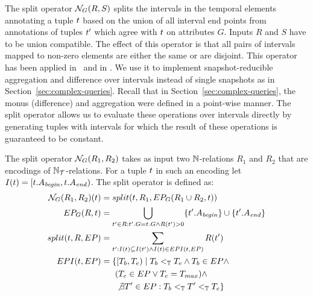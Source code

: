 The split operator $\mathcal{N}_{G}(R,S)$ splits the intervals in the
temporal elements annotating a tuple $t$ based on the union of
all interval end points from annotations of tuples $t'$ which
agree with $t$ on attributes $G$. Inputs $R$ and $S$ have to be
union compatible. The effect of this operator is that all pairs of
intervals mapped to non-zero elements are either the same or are
disjoint. This operator has been applied
in~\cite{DignosBG12,DignosBGJ16} and in \cite{BowmanT03,T98}. We use
it to implement snapshot-reducible aggregation and difference over
intervals instead of single snapshots as in
Section~\ref{sec:complex-queries}. Recall that in Section~\ref{sec:complex-queries}, the monus (difference) and aggregation were defined in a point-wise manner. The split operator allows us to evaluate these operations over intervals directly by generating tuples with intervals for which the result of these operations is guaranteed to be constant.

\begin{defi}
  The split operator $\mathcal{N}_G(R_1,R_2)$ takes as input two ${\mathbb{N}}$-relations $R_1$ and $R_2$ that are encodings of ${{\mathbb{N}}}_{\mathcal{T}}$-relations. For a tuple $t$ in such an encoding let $I(t) = [t.A_\mathit{begin}, t.A_\mathit{end})$. The split operator is defined as:
  \begin{align*}
    \normalizeOp_G(R_1,R_2)(\tuple) &= split(\tuple, R_1, EP_G(R_1 \cup R_2,t))\\
    EP_G(R,t) &= \bigcup_{t' \in R: t'.G = t.G \wedge R(t') > 0} \{t'.\attrBegin \} \cup \{t'.\attrEnd\}\\ %
    split(\tuple, R, EP) &= \sum_{\tuple': \interval(\tuple) \subseteq \interval(\tuple') \wedge \interval(\tuple) \in EPI(t, EP)} R(\tuple')\\
    EPI(t, EP) &= \{ [\tPoint_b , \tPoint_e) \mid  \tPoint_b \tLe \tPoint_e \wedge \tPoint_b \in EP \wedge\\ &\mathtab\mathtab(\tPoint_e  \in EP \vee T_e = \tMax) \wedge\\ &\mathtab\mathtab \not\exists \tPoint' \in EP: \tPoint_b \tLe \tPoint' \tLe \tPoint_e \}
  \end{align*}
\end{defi}

